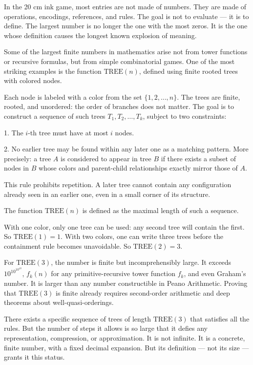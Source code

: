In the 20 cm ink game, most entries are not made of numbers. They are made of operations, encodings, references, and rules. The goal is not to evaluate — it is to define. The largest number is no longer the one with the most zeros. It is the one whose definition causes the longest known explosion of meaning.


Some of the largest finite numbers in mathematics arise not from tower functions or recursive formulas, but from simple combinatorial games. One of the most striking examples is the function $\mathrm{TREE}(n)$, defined using finite rooted trees with colored nodes.

Each node is labeled with a color from the set $\{1, 2, \dots, n\}$. The trees are finite, rooted, and unordered: the order of branches does not matter. The goal is to construct a sequence of such trees $T_1, T_2, \dots, T_k$, subject to two constraints:

1. The $i$-th tree must have at most $i$ nodes.

2. No earlier tree may be found within any later one as a matching pattern. More precisely: a tree $A$ is considered to appear in tree $B$ if there exists a subset of nodes in $B$ whose colors and parent-child relationships exactly mirror those of $A$.

This rule prohibits repetition. A later tree cannot contain any configuration already seen in an earlier one, even in a small corner of its structure.

The function $\mathrm{TREE}(n)$ is defined as the maximal length of such a sequence.

With one color, only one tree can be used: any second tree will contain the first. So $\mathrm{TREE}(1) = 1$. With two colors, one can write three trees before the containment rule becomes unavoidable. So $\mathrm{TREE}(2) = 3$.

For $\mathrm{TREE}(3)$, the number is finite but incomprehensibly large. It exceeds $10^{10^{10^{10}}}$, $f_k(n)$ for any primitive-recursive tower function $f_k$, and even Graham’s number. It is larger than any number constructible in Peano Arithmetic. Proving that $\mathrm{TREE}(3)$ is finite already requires second-order arithmetic and deep theorems about well-quasi-orderings. 

There exists a specific sequence of trees of length $\mathrm{TREE}(3)$ that satisfies all the rules. But the number of steps it allows is so large that it defies any representation, compression, or approximation. It is not infinite. It is a concrete, finite number, with a fixed decimal expansion. But its definition — not its size — grants it this status.

